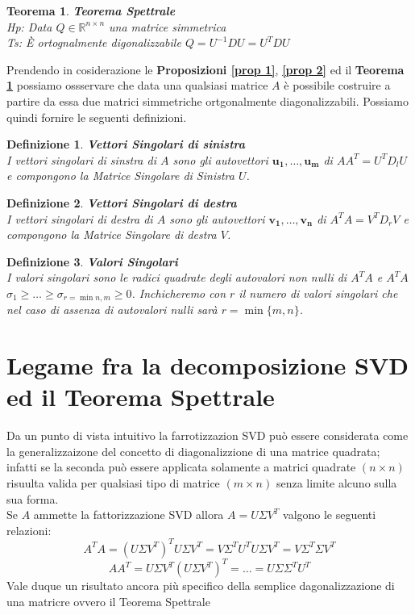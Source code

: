 \documentclass[11pt]{article}
\newtheorem{theorem}{Teorema}
\newtheorem{definition}{Definizione}
\begin{document}
\begin{theorem}\label{teo spetr}
\textbf{Teorema Spettrale}\\
\textit{Hp:} Data $Q\in\mathbb{R}^{n\times n}$ una matrice simmetrica\\
\textit{Ts:} È ortognalmente digonalizzabile $Q=U^{-1}DU=U^TDU$
\end{theorem}
\noindent
Prendendo in cosiderazione le \textbf{Proposizioni \autoref{prop 1}}, \textbf{\autoref{prop 2}} ed il \textbf{Teorema \ref{teo spetr}} possiamo ossservare che data una qualsiasi matrice $A$ è possibile costruire a partire da essa due matrici simmetriche ortgonalmente diagonalizzabili. Possiamo quindi fornire le seguenti definizioni.
\begin{definition}
	\textbf{Vettori Singolari di sinistra}\\ I vettori singolari di sinstra di $A$ sono gli autovettori $\mathbf{u_1, \dots ,u_m}$ di $AA^T=U^TD_lU$ e compongono la \textit{Matrice Singolare di Sinistra} $U$.
\end{definition}
\begin{definition}
	\textbf{Vettori Singolari di destra}\\ I vettori singolari di destra di $A$ sono gli autovettori $\mathbf{v_1, \dots ,v_n}$ di $A^TA=V^TD_rV$ e compongono la \textit{Matrice Singolare di destra} $V$.
\end{definition}
\begin{definition}
	\textbf{Valori Singolari}\\ I valori singolari sono le radici quadrate degli autovalori non nulli di $A^TA$ e $A^TA$\\ $\sigma_1 \geq \dots \geq \sigma_{r=\min{n,m}} \geq 0$. Inchicheremo con $r$ il numero di valori singolari che nel caso di assenza di autovalori nulli sarà $r=\min{\{m,n\}}$.
\end{definition}

\section{Legame fra la decomposizione SVD ed il Teorema Spettrale}
Da un punto di vista intuitivo la farrotizzazion SVD può essere considerata come la generalizzaizone del concetto di diagonalizzione di una matrice quadrata; infatti se la seconda può essere applicata solamente a matrici quadrate $(n \times n)$ risuulta valida per qualsiasi tipo di matrice $(m \times n)$ senza limite alcuno sulla sua forma.\\
Se $A$ ammette la fattorizzazione SVD allora $A=U\Sigma V^T$ valgono le seguenti relazioni: $$A^TA=(U\Sigma V^T)^TU\Sigma V^T=V\Sigma^TU^TU\Sigma V^T=V\Sigma^T \Sigma V^T$$
$$ AA^T=U\Sigma V^T(U\Sigma V^T)^T=\dots=U\Sigma \Sigma^T U^T$$ 
Vale duque un risultato ancora più specifico della semplice dagonalizzazione di una matricre ovvero il Teorema Spettrale
\end{document}
